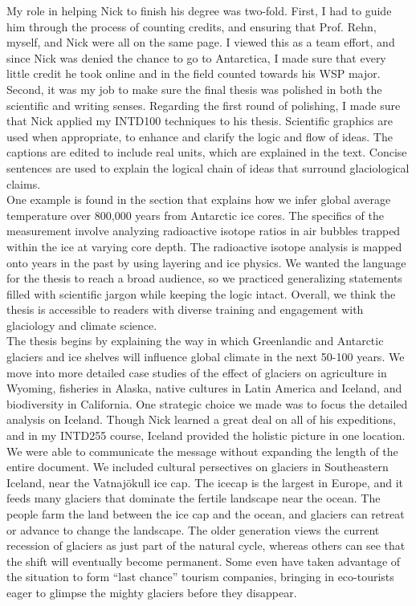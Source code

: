 \documentclass[../../../main.tex]{subfiles}
\begin{document}
My role in helping Nick to finish his degree was two-fold.  First, I had to guide him through the process of counting credits, and ensuring that Prof. Rehn, myself, and Nick were all on the same page.  I viewed this as a team effort, and since Nick was denied the chance to go to Antarctica, I made sure that every little credit he took online and in the field counted towards his WSP major.  Second, it was my job to make sure the final thesis was polished in both the scientific and writing senses.  Regarding the first round of polishing, I made sure that Nick applied my INTD100 techniques to his thesis.  Scientific graphics are used when appropriate, to enhance and clarify the logic and flow of ideas.  The captions are edited to include real units, which are explained in the text.  Concise sentences are used to explain the logical chain of ideas that surround glaciological claims.
\\
\vspace{0.25cm}
One example is found in the section that explains how we infer global average temperature over 800,000 years from Antarctic ice cores.  The specifics of the measurement involve analyzing radioactive isotope ratios in air bubbles trapped within the ice at varying core depth.  The radioactive isotope analysis is mapped onto years in the past by using layering and ice physics.  We wanted the language for the thesis to reach a broad audience, so we practiced generalizing statements filled with scientific jargon while keeping the logic intact.  Overall, we think the thesis is accessible to readers with diverse training and engagement with glaciology and climate science.
\\
\vspace{0.25cm}
The thesis begins by explaining the way in which Greenlandic and Antarctic glaciers and ice shelves will influence global climate in the next 50-100 years.  We move into more detailed case studies of the effect of glaciers on agriculture in Wyoming, fisheries in Alaska, native cultures in Latin America and Iceland, and biodiversity in California.  One strategic choice we made was to focus the detailed analysis on Iceland.  Though Nick learned a great deal on all of his expeditions, and in my INTD255 course, Iceland provided the holistic picture in one location.  We were able to communicate the message without expanding the length of the entire document.  We included cultural persectives on glaciers in Southeastern Iceland, near the Vatnaj\"{o}kull ice cap.  The icecap is the largest in Europe, and it feeds many glaciers that dominate the fertile landscape near the ocean.  The people farm the land between the ice cap and the ocean, and glaciers can retreat or advance to change the landscape.  The older generation views the current recession of glaciers as just part of the natural cycle, whereas others can see that the shift will eventually become permanent.  Some even have taken advantage of the situation to form ``last chance'' tourism companies, bringing in eco-tourists eager to glimpse the mighty glaciers before they disappear.
\end{document}
